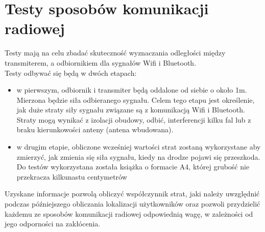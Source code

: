\chapter{Testy sposobów komunikacji radiowej}
\label{cha:teoria}

Testy mają na celu zbadać skuteczność wyznaczania odległości między transmiterem, a odbiornikiem dla sygnałów Wifi i Bluetooth.\\
Testy odbywać się będą w dwóch etapach:
\begin{itemize}
	\item w pierwszym, odbiornik i transmiter będą oddalone od siebie o około 1m. Mierzona będzie siła odbieranego sygnału. Celem tego etapu jest określenie, jak duże straty siły sygnału związane są z komunikacją Wifi i Bluetooth. Straty mogą wynikać z izolacji obudowy, odbić, interferencji kilku fal lub z braku kierunkowości anteny (antena wbudowana).
	\item w drugim etapie, obliczone wcześniej wartości strat zostaną wykorzystane aby zmierzyć, jak zmienia się siła sygnału, kiedy na drodze pojawi się przeszkoda. Do testów wykorzystana została książka o formacie A4, której grubość nie przekracza kilkunastu centymetrów
\end{itemize}
Uzyskane informacje pozwolą obliczyć współczynnik strat, jaki należy uwzględnić podczas późniejszego obliczania lokalizacji użytkowników oraz pozwoli przydzielić każdemu ze sposobów komunikacji radiowej odpowiednią wagę, w zależności od jego odporności na zakłócenia.
